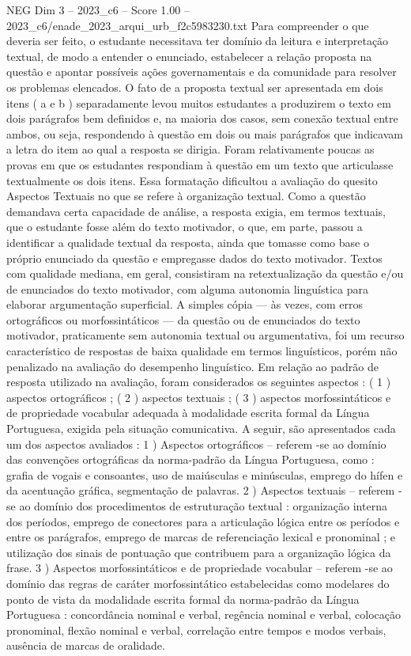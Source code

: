 \begin{textsample}{NEG Dim 3 – 2023\_c6 – Score 1.00 – 2023\_c6/enade\_2023\_arqui\_urb\_f2c5983230.txt}
Para compreender o que deveria ser feito, o estudante necessitava ter domínio da leitura e interpretação textual, de modo a entender o enunciado, estabelecer a relação proposta na questão e apontar possíveis ações governamentais e da comunidade para resolver os problemas elencados.
O fato de a proposta textual ser apresentada em dois itens ( a e b ) separadamente levou muitos estudantes a produzirem o texto em dois parágrafos bem definidos e, na maioria dos casos, sem conexão textual entre ambos, ou seja, respondendo à questão em dois ou mais parágrafos que indicavam a letra do item ao qual a resposta se dirigia.
Foram relativamente poucas as provas em que os estudantes respondiam à questão em um texto que articulasse textualmente os dois itens.
Essa formatação dificultou a avaliação do quesito Aspectos Textuais no que se refere à organização textual.
Como a questão demandava certa capacidade de análise, a resposta exigia, em termos textuais, que o estudante fosse além do texto motivador, o que, em parte, passou a identificar a qualidade textual da resposta, ainda que tomasse como base o próprio enunciado da questão e empregasse dados do texto motivador.
Textos com qualidade mediana, em geral, consistiram na retextualização da questão e/ou de enunciados do texto motivador, com alguma autonomia linguística para elaborar argumentação superficial.
A simples cópia — às vezes, com erros ortográficos ou morfossintáticos — da questão ou de enunciados do texto motivador, praticamente sem autonomia textual ou argumentativa, foi um recurso característico de respostas de baixa qualidade em termos linguísticos, porém não penalizado na avaliação do desempenho linguístico.
Em relação ao padrão de resposta utilizado na avaliação, foram considerados os seguintes aspectos : ( 1 ) aspectos ortográficos ; ( 2 ) aspectos textuais ; ( 3 ) aspectos morfossintáticos e de propriedade vocabular adequada à modalidade escrita formal da Língua Portuguesa, exigida pela situação comunicativa.
A seguir, são apresentados cada um dos aspectos avaliados : 1 ) Aspectos ortográficos – referem -se ao domínio das convenções ortográficas da norma-padrão da Língua Portuguesa, como : grafia de vogais e consoantes, uso de maiúsculas e minúsculas, emprego do hífen e da acentuação gráfica, segmentação de palavras. 2 ) Aspectos textuais – referem -se ao domínio dos procedimentos de estruturação textual : organização interna dos períodos, emprego de conectores para a articulação lógica entre os períodos e entre os parágrafos, emprego de marcas de referenciação lexical e pronominal ; e utilização dos sinais de pontuação que contribuem para a organização lógica da frase. 3 ) Aspectos morfossintáticos e de propriedade vocabular – referem -se ao domínio das regras de caráter morfossintático estabelecidas como modelares do ponto de vista da modalidade escrita formal da norma-padrão da Língua Portuguesa : concordância nominal e verbal, regência nominal e verbal, colocação pronominal, flexão nominal e verbal, correlação entre tempos e modos verbais, ausência de marcas de oralidade.

\end{textsample}
